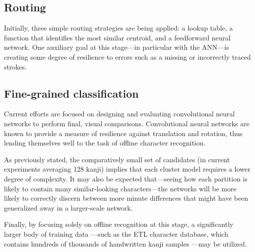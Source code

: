 \documentclass[10pt,conference,a4paper]{IEEEtran}
\begin{document}


	\subsection{Routing}

	Initially, three simple routing strategies are being applied: a lookup table, a function that
	identifies the most similar centroid, and a feedforward neural network. One auxiliary goal
	at this stage---in particular with the ANN---is creating some degree of resilience to errors
	such as a missing or incorrectly traced strokes.


	\subsection{Fine-grained classification}

	Current efforts are focused on designing and evaluating convolutional neural networks to perform final, visual comparisons.
	\mbox{Convolutional} neural networks are known to provide a measure of resilience against translation and rotation,
	thus lending themselves well to the task of offline character recognition.
	
	As previously stated, the comparatively small set of candidates (in current experiments averaging 128 kanji)
	implies that each cluster model requires a lower degree of complexity. It may also be expected that---seeing
	how each partition is likely to contain many similar-looking characters---the networks will be more likely
	to correctly discern between more minute differences that might have been generalized away in a larger-scale network.

	Finally, by focusing solely on offline recognition at this stage, a significantly larger body of training data
	---such as the ETL character database, which contains hundreds of thousands of handwritten kanji samples \cite{yamamoto1986recognition}---may be utilized. 
\end{document}
